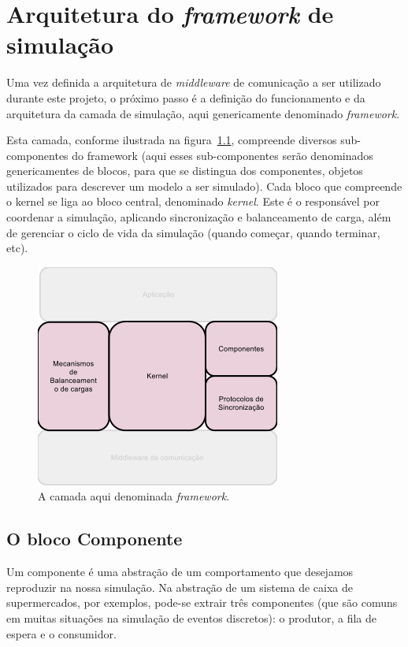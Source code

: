 \chapter{Arquitetura do \textit{framework} de simulação}

Uma vez definida a arquitetura de \textit{middleware} de comunicação a ser utilizado durante este projeto, o próximo passo é a definição do funcionamento e da arquitetura da camada de simulação, aqui genericamente denominado \textit{framework}.

Esta camada, conforme ilustrada na figura~\ref{fig:camada_central}, compreende diversos sub-componentes do framework (aqui esses sub-componentes serão denominados genericamentes de blocos, para que se distingua dos componentes, objetos utilizados para descrever um modelo a ser simulado). Cada bloco que compreende o kernel se liga ao bloco central, denominado \textit{kernel}. Este é o responsável por coordenar a simulação, aplicando sincronização e balanceamento de carga, além de gerenciar o ciclo de vida da simulação (quando começar, quando terminar, etc).

\begin{figure}
  \centerline{\includegraphics{camada_framework.png}}
  \caption{A camada aqui denominada \textit{framework}.}
\label{fig:camada_central}
\end{figure}

\section{O bloco Componente}

Um componente é uma abstração de um comportamento que desejamos reproduzir na nossa simulação. Na abstração de um sistema de caixa de supermercados, por exemplos, pode-se extrair três componentes (que são comuns em muitas situações na simulação de eventos discretos): o produtor, a fila de espera e o consumidor.

